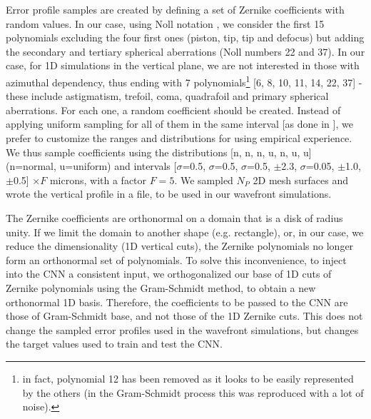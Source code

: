 \documentclass[preprint]{iucr}
\newcommand{\inred}[1]{{\color{red}#1}}
\begin{document}
Error profile samples are \inred{created by} defining a set of Zernike coefficients with random values. In our case, using Noll notation \cite{Noll:76}, we consider the first 15 polynomials excluding the four first ones (piston, tip, tip and defocus) but adding the secondary and \inred{tertiary} spherical aberrations (Noll numbers 22 and 37). In our case, for 1D simulations in the vertical plane, we are not interested in those with azimuthal dependency, thus ending with 7 polynomials\footnote{in fact, polynomial 12 has been removed as it looks to be easily represented by the others (in the Gram-Schmidt process this was reproduced with a lot of noise). } [6, 8, 10, 11, 14, 22, 37] - \inred{these include astigmatism, trefoil, coma, quadrafoil and primary spherical aberrations}. For each one, a random coefficient should be created. Instead of applying uniform sampling for all of them in the same interval [as done in \cite{Saha2020}], we prefer to customize the ranges and distributions for using empirical experience. We thus sample coefficients using the distributions [n, n, n, u, n, u, u]  (n=normal, u=uniform) and intervals [$\sigma$=0.5, $\sigma$=0.5, $\sigma$=0.5, $\pm$2.3, $\sigma$=0.05, $\pm$1.0, $\pm$0.5] $\times F$ microns, with a factor $F=5$. We sampled $N_P$ 2D mesh surfaces and wrote the vertical profile in a file, to be used in our wavefront simulations.

The Zernike coefficients are orthonormal on a domain that is a disk of radius unity. If we limit the domain to another shape (e.g. rectangle), or, in our case, we reduce the dimensionality (1D vertical cuts), the Zernike polynomials no longer form an orthonormal set of polynomials. To solve this inconvenience, to inject into the CNN a consistent input, we orthogonalized our base of 1D cuts of Zernike polynomials using the Gram-Schmidt method, to obtain a new orthonormal 1D basis. Therefore, the coefficients to be passed to the CNN are those of Gram-Schmidt base, and not those of the 1D Zernike cuts. This does not change the sampled error profiles used in the wavefront simulations, but changes the target values used to train and test the CNN.  

\end{document}
